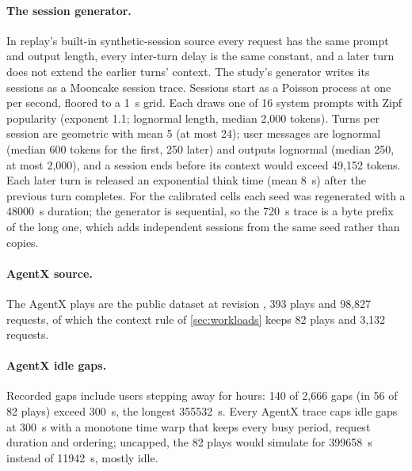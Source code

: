 \paragraph{The session generator.}
In replay's built-in synthetic-session source every request has the same prompt and output length,
every inter-turn delay is the same constant, and a later turn does not extend the earlier turns'
context. The study's generator writes its sessions as a Mooncake session trace. Sessions start
as a Poisson process at one per second, floored to a \SI{1}{s} grid. Each draws one of 16 system
prompts with Zipf popularity (exponent 1.1; lognormal length, median 2,000 tokens). Turns per
session are geometric with mean 5 (at most 24); user messages are lognormal (median 600 tokens for
the first, 250 later) and outputs lognormal (median 250, at most 2,000), and a session ends before
its context would exceed 49,152 tokens. Each later turn is released an exponential think time
(mean \SI{8}{s}) after the previous turn completes.
For the calibrated cells each seed was regenerated with a \SI{48000}{s} duration; the generator is
sequential, so the \SI{720}{s} trace is a byte prefix of the long one, which adds independent
sessions from the same seed rather than copies.

\paragraph{AgentX source.}
The AgentX plays are the public dataset  at revision
 \citep{agentxtraces}, 393 plays and 98,827 requests, of which the context rule of
\cref{sec:workloads} keeps 82 plays and 3,132 requests.

\paragraph{AgentX idle gaps.}
Recorded gaps include users stepping away for hours: 140 of 2,666 gaps (in 56 of 82 plays)
exceed \SI{300}{s}, the longest \SI{355532}{s}. Every AgentX trace caps idle gaps at
\SI{300}{s} with a monotone time warp that keeps every busy period, request duration and
ordering; uncapped, the 82 plays would simulate for \SI{399658}{s} instead of \SI{11942}{s},
mostly idle.

